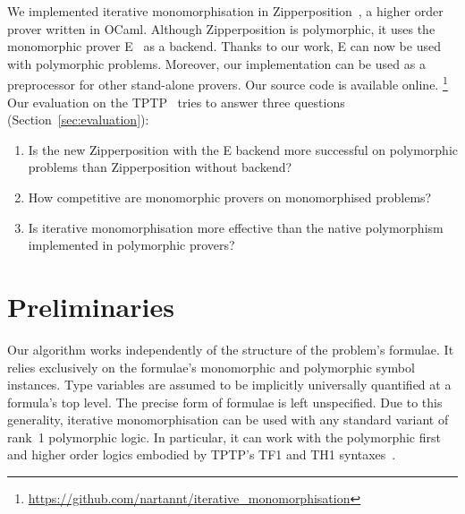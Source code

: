 \documentclass[runningheads]{llncs}
\begin{document}
We implemented iterative monomorphisation in Zipperposition~\cite{vukmirovic-et-al-2021}, a higher order prover written in OCaml. Although Zipperposition is polymorphic, it uses the monomorphic prover E~\cite{e} as a backend. Thanks to our work, E can now be used with polymorphic problems. Moreover, our implementation can be used as a preprocessor for other stand-alone provers.
Our source code is available online.%
\footnote{\url{https://github.com/nartannt/iterative_monomorphisation}}
%
Our evaluation on the TPTP~\cite{tptp} tries to answer three questions (Section~\ref{sec:evaluation}):
\begin{enumerate}
\item Is the new Zipperposition with the E backend more successful on polymorphic problems than Zipperposition without backend?

\item How competitive are monomorphic provers on monomorphised %
problems?

\item Is iterative monomorphisation more effective than the native polymorphism implemented in polymorphic provers?
\end{enumerate}

%
%

\kern-1pt %

\section{Preliminaries}
\label{sec:preliminaries}

Our algorithm works independently of the structure of the problem's formulae. It relies exclusively on the formulae's monomorphic and polymorphic symbol instances. Type variables are assumed to be implicitly universally quantified at a formula's top level. The precise form of formulae is left unspecified.
Due to this generality, iterative monomorphisation can be used with any standard variant of rank~1 polymorphic logic. In particular, it can work with the polymorphic first and higher order logics embodied by TPTP's TF1 and TH1 syntaxes~\cite{blanchette-paskevich-2013,th1}.
\end{document}
